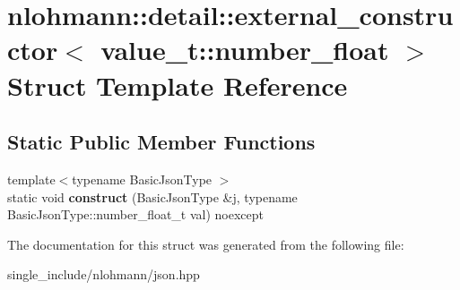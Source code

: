 \hypertarget{structnlohmann_1_1detail_1_1external__constructor_3_01value__t_1_1number__float_01_4}{}\section{nlohmann\+:\+:detail\+:\+:external\+\_\+constructor$<$ value\+\_\+t\+:\+:number\+\_\+float $>$ Struct Template Reference}
\label{structnlohmann_1_1detail_1_1external__constructor_3_01value__t_1_1number__float_01_4}
\subsection*{Static Public Member Functions}
\begin{DoxyCompactItemize}
\item 
\mbox{\label{structnlohmann_1_1detail_1_1external__constructor_3_01value__t_1_1number__float_01_4_a669df5a4d258b588e67f747c6d656cdb}} 
{\footnotesize template$<$typename Basic\+Json\+Type $>$ }\\static void {\bfseries construct} (Basic\+Json\+Type \&j, typename Basic\+Json\+Type\+::number\+\_\+float\+\_\+t val) noexcept
\end{DoxyCompactItemize}


The documentation for this struct was generated from the following file\+:\begin{DoxyCompactItemize}
\item 
single\+\_\+include/nlohmann/json.\+hpp\end{DoxyCompactItemize}
